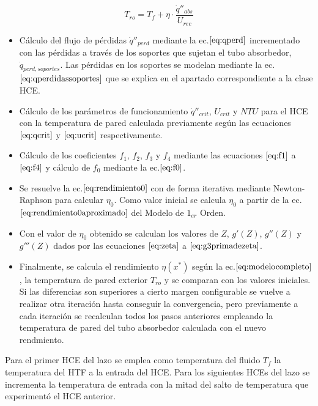 \documentclass[11pt]{article}
\providecommand{\tightlist}{%
      \setlength{\itemsep}{0pt}\setlength{\parskip}{0pt}}
\begin{document}
\begin{equation}
    T_{ro} = T_f + \eta \cdot \frac{\dot q''_{abs}}{U_{rec}}
    \label{eq:tro}
\end{equation}

\begin{itemize}
\tightlist
\item
  Cálculo del flujo de pérdidas \(\dot q''_{perd}\) mediante la
  ec.\(\eqref{eq:qperd}\) incrementado con las pérdidas a través de los
  soportes que sujetan el tubo absorbedor, \(\dot q_{perd,soportes}\).
  Las pérdidas en los soportes se modelan mediante la
  ec.\(\eqref{eq:qperdidassoportes}\) que se explica en el apartado
  correspondiente a la clase HCE.
\item
  Cálculo de los parámetros de funcionamiento \(\dot q''_{crit}\),
  \(U_{crit}\) y \(NTU\) para el HCE con la temperatura de pared
  calculada previamente según las ecuaciones \(\eqref{eq:qcrit}\) y
  \(\eqref{eq:ucrit}\) respectivamente.
\item
  Cálculo de los coeficientes \(f_1\), \(f_2\), \(f_3\) y \(f_4\)
  mediante las ecuaciones \(\eqref{eq:f1}\) a \(\eqref{eq:f4}\) y
  cálculo de \(f_0\) mediante la ec.\(\eqref{eq:f0}\).
\item
  Se resuelve la ec.\(\eqref{eq:rendimiento0}\) con de forma iterativa
  mediante Newton-Raphson para calcular \(\eta_0\). Como valor inicial
  se calcula \(\eta_0\) a partir de la
  ec.\(\eqref{eq:rendimiento0aproximado}\) del Modelo de \(1_{er}\)
  Orden.
\item
  Con el valor de \(\eta_0\) obtenido se calculan los valores de \(Z\),
  \(g'(Z)\), \(g''(Z)\) y \(g'''(Z)\) dados por las ecuaciones
  \(\eqref{eq:zeta}\) a \(\eqref{eq:g3primadezeta}\).
\item
  Finalmente, se calcula el rendimiento \(\eta(x^*)\) según la
  ec.\(\eqref{eq:modelocompleto}\), la temperatura de pared exterior
  \(T_{ro}\) y se comparan con los valores iniciales. Si las diferencias
  son superiores a cierto margen configurable se vuelve a realizar otra
  iteración hasta conseguir la convergencia, pero previamente a cada
  iteración se recalculan todos los pasos anteriores empleando la
  temperatura de pared del tubo absorbedor calculada con el nuevo
  rendmiento.
\end{itemize}

Para el primer HCE del lazo se emplea como temperatura del fluido
\(T_f\) la temperatura del HTF a la entrada del HCE. Para los siguientes
HCEs del lazo se incrementa la temperatura de entrada con la mitad del
salto de temperatura que experimentó el HCE anterior.
\end{document}
